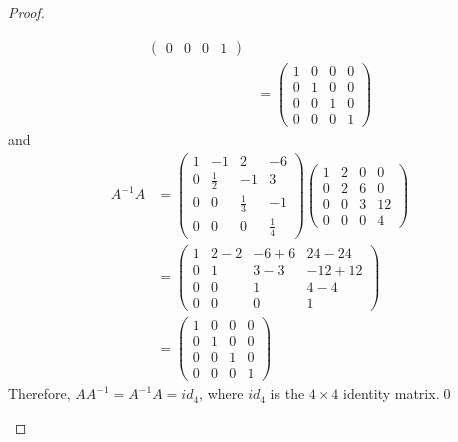 \begin{proof}
\begin{enumerate}[(i)]
\[\begin{aligned}
\begin{pmatrix}
                    0 & 0 & 0 & 1
                \end{pmatrix}\\
                &=\begin{pmatrix}
                    1 & 0 & 0 & 0\\
                    0 & 1 & 0 & 0\\
                    0 & 0 & 1 & 0\\
                    0 & 0 & 0 & 1
                \end{pmatrix}
            \end{aligned}
        \]
        and 
        \[
            \begin{aligned}
                A^{-1}A&=\begin{pmatrix}
                    1 & -1 & 2 & -6\\
                    0 & \frac{1}{2} & -1 & 3\\
                    0 & 0 & \frac{1}{3} & -1\\
                    0 & 0 & 0 & \frac{1}{4}
                \end{pmatrix}
                \begin{pmatrix}
                    1 & 2 & 0 & 0\\
                    0 & 2 & 6 & 0\\
                    0 & 0 & 3 & 12\\
                    0 & 0 & 0 & 4
                \end{pmatrix}\\
                &=\begin{pmatrix}
                    1 & 2-2 & -6+6 & 24-24\\
                    0 & 1 & 3-3 & -12+12\\
                    0 & 0 & 1 & 4-4\\
                    0 & 0 & 0 & 1
                \end{pmatrix}\\
                &=\begin{pmatrix}
                    1 & 0 & 0 & 0\\
                    0 & 1 & 0 & 0\\
                    0 & 0 & 1 & 0\\
                    0 & 0 & 0 & 1
                \end{pmatrix}
            \end{aligned}
        \]
        Therefore, $AA^{-1}=A^{-1}A=id_4$, where $id_4$ is the $4\times 4$ identity matrix.\qed

\end{enumerate}
\end{proof}
